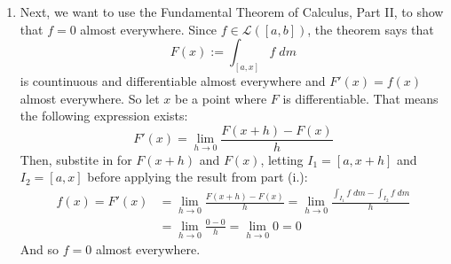\documentclass[12pt]{article}
\theoremstyle{plain}
\theoremstyle{definition}
\theoremstyle{remark}
\begin{document}
\begin{enumerate}
\begin{enumerate}
\begin{enumerate}
\item Next, we want to use the Fundamental Theorem of Calculus, Part II, to show that $f=0$ almost everywhere. Since $f\in\mathscr{L}([a,b])$, the theorem says that 
\[
    F(x) := \int_{[a,x]} f \; dm
\]
is countinuous and differentiable almost everywhere and $F'(x)=f(x)$ almost everywhere. So let $x$ be a point where $F$ is differentiable. That means the following expression exists:
\[
    F'(x) = \lim_{h\rightarrow 0} \frac{F(x+h) - F(x)}{h}
\]
Then, substite in for $F(x+h)$ and $F(x)$, letting $I_1=[a,x+h]$ and $I_2=[a,x]$ before applying the result from part (i.):
\begin{align*}
    f(x) = F'(x) 
    &= \lim_{h\rightarrow 0} \frac{F(x+h) - F(x)}{h}
    = \lim_{h\rightarrow 0} 
    \frac{\int_{I_1} f \; dm - \int_{I_2} f \; dm}{h} \\
    &= \lim_{h\rightarrow 0} 
    \frac{0-0}{h} = \lim_{h\rightarrow 0}0 = 0
\end{align*}
And so $f=0$ almost everywhere.
\end{enumerate} 



\end{enumerate} 

\end{enumerate} 
\end{document}

